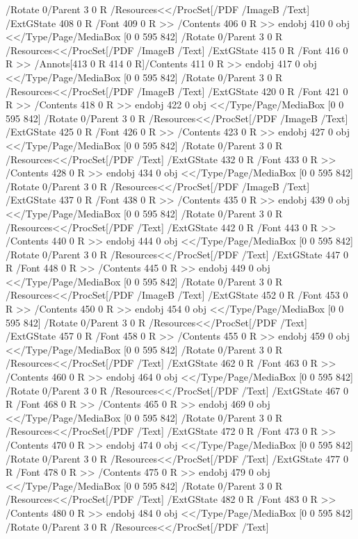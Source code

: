 {{{{{{{{{{{{{{{{{{{{{{{{{{{{/Rotate 0/Parent 3 0 R
/Resources<</ProcSet[/PDF /ImageB /Text]
/ExtGState 408 0 R
/Font 409 0 R
>>
/Contents 406 0 R
>>
endobj
410 0 obj
<</Type/Page/MediaBox [0 0 595 842]
/Rotate 0/Parent 3 0 R
/Resources<</ProcSet[/PDF /ImageB /Text]
/ExtGState 415 0 R
/Font 416 0 R
>>
/Annots[413 0 R
414 0 R]/Contents 411 0 R
>>
endobj
417 0 obj
<</Type/Page/MediaBox [0 0 595 842]
/Rotate 0/Parent 3 0 R
/Resources<</ProcSet[/PDF /ImageB /Text]
/ExtGState 420 0 R
/Font 421 0 R
>>
/Contents 418 0 R
>>
endobj
422 0 obj
<</Type/Page/MediaBox [0 0 595 842]
/Rotate 0/Parent 3 0 R
/Resources<</ProcSet[/PDF /ImageB /Text]
/ExtGState 425 0 R
/Font 426 0 R
>>
/Contents 423 0 R
>>
endobj
427 0 obj
<</Type/Page/MediaBox [0 0 595 842]
/Rotate 0/Parent 3 0 R
/Resources<</ProcSet[/PDF /Text]
/ExtGState 432 0 R
/Font 433 0 R
>>
/Contents 428 0 R
>>
endobj
434 0 obj
<</Type/Page/MediaBox [0 0 595 842]
/Rotate 0/Parent 3 0 R
/Resources<</ProcSet[/PDF /ImageB /Text]
/ExtGState 437 0 R
/Font 438 0 R
>>
/Contents 435 0 R
>>
endobj
439 0 obj
<</Type/Page/MediaBox [0 0 595 842]
/Rotate 0/Parent 3 0 R
/Resources<</ProcSet[/PDF /Text]
/ExtGState 442 0 R
/Font 443 0 R
>>
/Contents 440 0 R
>>
endobj
444 0 obj
<</Type/Page/MediaBox [0 0 595 842]
/Rotate 0/Parent 3 0 R
/Resources<</ProcSet[/PDF /Text]
/ExtGState 447 0 R
/Font 448 0 R
>>
/Contents 445 0 R
>>
endobj
449 0 obj
<</Type/Page/MediaBox [0 0 595 842]
/Rotate 0/Parent 3 0 R
/Resources<</ProcSet[/PDF /ImageB /Text]
/ExtGState 452 0 R
/Font 453 0 R
>>
/Contents 450 0 R
>>
endobj
454 0 obj
<</Type/Page/MediaBox [0 0 595 842]
/Rotate 0/Parent 3 0 R
/Resources<</ProcSet[/PDF /Text]
/ExtGState 457 0 R
/Font 458 0 R
>>
/Contents 455 0 R
>>
endobj
459 0 obj
<</Type/Page/MediaBox [0 0 595 842]
/Rotate 0/Parent 3 0 R
/Resources<</ProcSet[/PDF /Text]
/ExtGState 462 0 R
/Font 463 0 R
>>
/Contents 460 0 R
>>
endobj
464 0 obj
<</Type/Page/MediaBox [0 0 595 842]
/Rotate 0/Parent 3 0 R
/Resources<</ProcSet[/PDF /Text]
/ExtGState 467 0 R
/Font 468 0 R
>>
/Contents 465 0 R
>>
endobj
469 0 obj
<</Type/Page/MediaBox [0 0 595 842]
/Rotate 0/Parent 3 0 R
/Resources<</ProcSet[/PDF /Text]
/ExtGState 472 0 R
/Font 473 0 R
>>
/Contents 470 0 R
>>
endobj
474 0 obj
<</Type/Page/MediaBox [0 0 595 842]
/Rotate 0/Parent 3 0 R
/Resources<</ProcSet[/PDF /Text]
/ExtGState 477 0 R
/Font 478 0 R
>>
/Contents 475 0 R
>>
endobj
479 0 obj
<</Type/Page/MediaBox [0 0 595 842]
/Rotate 0/Parent 3 0 R
/Resources<</ProcSet[/PDF /Text]
/ExtGState 482 0 R
/Font 483 0 R
>>
/Contents 480 0 R
>>
endobj
484 0 obj
<</Type/Page/MediaBox [0 0 595 842]
/Rotate 0/Parent 3 0 R
/Resources<</ProcSet[/PDF /Text]
}}}}}}}}}}}}}}}}}}}}}}}}}}}}

